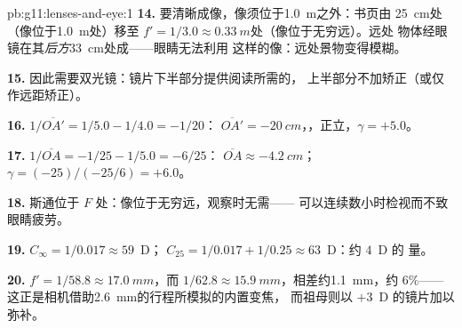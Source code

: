 \begin{solution}{pb:g11:lenses-and-eye:1}
\textbf{14.} 要清晰成像，像须位于\qty{1.0}{m}之外：书页由
\qty{25}{cm}处（像位于\qty{1.0}{m}处）移至
$f' = 1/3.0 \approx \qty{0.33}{m}$处（像位于无穷远）。远处
物体经眼镜在其\emph{后方}\qty{33}{cm}处成——眼睛无法利用
这样的像：远处景物变得模糊。

\textbf{15.} 因此需要双光镜：镜片下半部分提供阅读所需的，
上半部分不加矫正（或仅作远距矫正）。

\textbf{16.} $1/\overline{OA'} = 1/5.0 - 1/4.0 = -1/20$：
$\overline{OA'} = \qty{-20}{cm}$，，正立，$\gamma = +5.0$。

\textbf{17.} $1/\overline{OA} = -1/25 - 1/5.0 = -6/25$：
$\overline{OA} \approx \qty{-4.2}{cm}$；$\gamma = (-25)/(-25/6) = +6.0$。

\textbf{18.} 斯通位于 $F$ 处：像位于无穷远，观察时无需——
可以连续数小时检视而不致眼睛疲劳。

\textbf{19.} $C_\infty = 1/0.017 \approx 59$~D；
$C_{25} = 1/0.017 + 1/0.25 \approx 63$~D：约 $4$~D 的
量。

\textbf{20.} $f' = 1/58.8 \approx \qty{17.0}{mm}$，而
$1/62.8 \approx \qty{15.9}{mm}$，相差约\qty{1.1}{mm}，约 $6\%$——
这正是相机借助\qty{2.6}{mm}的行程所模拟的内置变焦，
而祖母则以 $+3$~D 的镜片加以弥补。
\end{solution}
